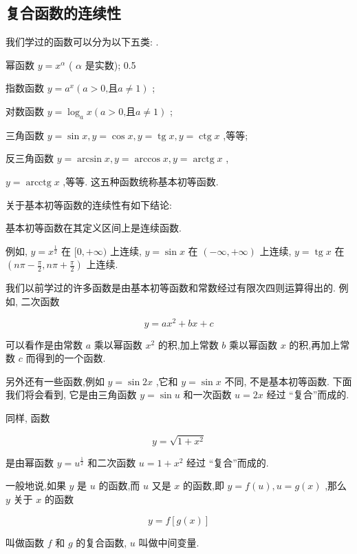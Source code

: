 \documentclass[lang=cn,newtx,10pt,scheme=chinese]{elegantbook}
\begin{document}
\subsection*{复合函数的连续性}
我们学过的函数可以分为以下五类: .

幂函数 \(y = {x}^{\alpha }\) ( \(\alpha\) 是实数); 0.5

指数函数 \(y = {a}^{x}\left( {a > 0\text{,且}a \neq 1}\right)\) ;

对数函数 \(y = {\log }_{a}x\left( {a > 0\text{,且}a \neq 1}\right)\) ;

三角函数 \(y = \sin x,y = \cos x,y = \operatorname{tg}x,y = \operatorname{ctg}x\) ,等等;

反三角函数 \(y = \arcsin x,y = \arccos x,y = \operatorname{arctg}x\) ,

\(y = \operatorname{arcctg}x\) ,等等. 这五种函数统称基本初等函数.

关于基本初等函数的连续性有如下结论:

基本初等函数在其定义区间上是连续函数.

例如, \(y = {x}^{\frac{1}{2}}\) 在 \(\lbrack 0, + \infty )\) 上连续, \(y = \sin x\) 在 \(\left( {-\infty , + \infty }\right)\) 上连续, \(y = \operatorname{tg}x\) 在 \(\left( {{n\pi } - \frac{\pi }{2},{n\pi } + \frac{\pi }{2}}\right)\) 上连续.

我们以前学过的许多函数是由基本初等函数和常数经过有限次四则运算得出的. 例如, 二次函数

\[
y = a{x}^{2} + {bx} + c
\]

可以看作是由常数 \(a\) 乘以幂函数 \({x}^{2}\) 的积,加上常数 \(b\) 乘以幂函数 \(x\) 的积,再加上常数 \(c\) 而得到的一个函数.

另外还有一些函数,例如 \(y = \sin {2x}\) ,它和 \(y = \sin x\) 不同, 不是基本初等函数. 下面我们将会看到, 它是由三角函数 \(y = \sin u\) 和一次函数 \(u = {2x}\) 经过 “复合”而成的.

同样, 函数

\[
y = \sqrt{1 + {x}^{2}}
\]

是由幂函数 \(y = {u}^{\frac{1}{2}}\) 和二次函数 \(u = 1 + {x}^{2}\) 经过 “复合”而成的.

\begin{definition}[复合函数] 

一般地说,如果 \(y\) 是 \(u\) 的函数,而 \(u\) 又是 \(x\) 的函数,即 \(y = f\left( u\right) ,u = g\left( x\right)\) ,那么 \(y\) 关于 \(x\) 的函数

\[
y = f\left\lbrack {g\left( x\right) }\right\rbrack
\]

叫做函数 \(f\) 和 \(g\) 的复合函数, \(u\) 叫做中间变量.

\end{definition}
\end{document}
